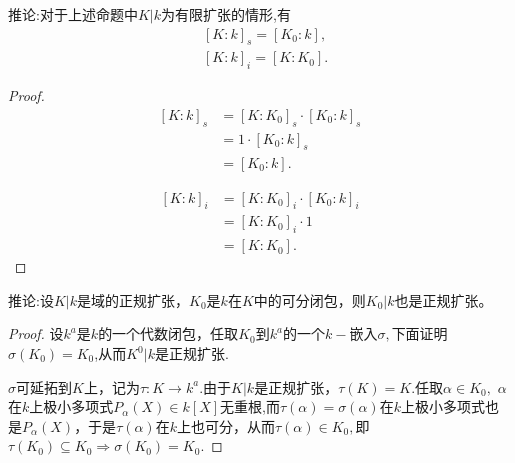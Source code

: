 \documentclass[UTF8]{article}
\begin{document}
推论:对于上述命题中$K|k$为有限扩张的情形,有
\[
\begin{split}
&[K:k]_{s}=[K_{0}:k],\\
&[K:k]_{i}=[K:K_{0}].
\end{split}
\]
\begin{proof}
	
	\[\begin{split}
	[K:k]_{s}&=[K:K_{0}]_{s}\cdot [K_{0}:k]_{s}\\
	&=1\cdot [K_{0}:k]_{s}\\
	&=[K_{0}:k].
	\end{split}		
	\]
	
	
	\[\begin{split}
	[K:k]_{i}&=[K:K_{0}]_{i}\cdot [K_{0}:k]_{i}\\
	&= [K:K_{0}]_{i}\cdot 1\\
	&=[K:K_{0}].
	\end{split}		
	\]
	
\end{proof}
推论:设$K|k$是域的正规扩张，$K_{0}$是$k$在$K$中的可分闭包，则$K_{0}|k$也是正规扩张。\\
\begin{proof}
	设$k^{a}$是$k$的一个代数闭包，任取$K_{0}$到$k^{a}$的一个$k-$嵌入$\sigma,$下面证明$\sigma(K_{0})=K_{0}$,从而$K^{0}|k$是正规扩张.
	
	
	$\sigma$可延拓到$K$上，记为$\tau:K\rightarrow k^{a}.$由于$K|k$是正规扩张，$\tau(K)=K.$任取$\alpha \in K_{0},$ $\alpha$在$k$上极小多项式$P_{\alpha}(X)\in k[X]$无重根,而$\tau(\alpha)=\sigma(\alpha)$在$k$上极小多项式也是$P_{\alpha}(X)$，于是$\tau(\alpha)$在$k$上也可分，从而$\tau(\alpha)\in K_{0},$即$\tau(K_{0})\subseteq K_{0}\Rightarrow \sigma(K_{0})=K_{0}.$
\end{proof}
\end{document}

